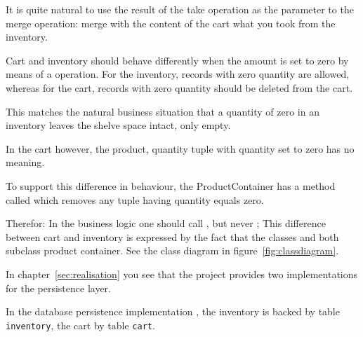 It is quite natural to use the result of the take operation as the parameter to the merge operation:
merge with the content of the cart what you took from the inventory.
 
Cart and inventory should behave differently when the amount is
set to zero by means of a  operation. For the inventory, records
with zero quantity are allowed, whereas for the cart, records with zero
quantity should be deleted from the cart.

This matches the natural business situation that a quantity of zero in
an inventory leaves the shelve space intact, only empty.

In the cart however, the product, quantity tuple with quantity set to
zero has no meaning. 

To support this difference in behaviour, the ProductContainer has a method
called  which removes any tuple having quantity equals
zero.

Therefor: In the business logic one should call , but never ;
This difference between cart and inventory is expressed by the fact
that the classes  and  both subclass
product container. See the class diagram in
figure~\ref{fig:classdiagram}.


In chapter~\ref{sec:realisation} you see that the project provides two
implementations for the persistence layer.

In the database persistence implementation , the inventory is backed by table
\texttt{inventory}, the cart by table \texttt{cart}.
